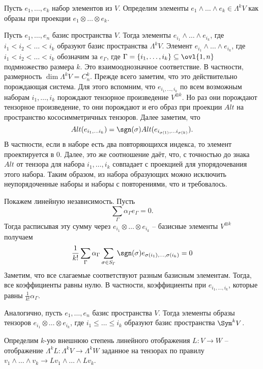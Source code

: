 \dfn Пусть $e_1,\dots, e_k$ набор элементов из $V$. Определим элементы $e_1\wedge \dots \wedge e_k \in \Lambda^k V$ как образы при проекции $e_1\otimes \dots \otimes e_k$.
\edfn

\thrm Пусть $e_1,\dots, e_n$ базис пространства $V$. Тогда элементы $e_{i_1}\wedge \dots \wedge e_{i_k}$, где $i_1<i_2< \dots < i_k$ образуют базис пространства $\Lambda^k V$. Элемент $e_{i_1}\wedge \dots \wedge e_{i_k}$, где $i_1<i_2< \dots < i_k$  обозначим за $e_{\Gamma}$, где $\Gamma =\{i_1,\dots,i_k\}\subseteq \ovl{1,n}$ подмножество размера $k$. Это взаимооднозначное соответствие. В частности, размерность $\dim \Lambda^k V = C^k_n$. 
\proof Прежде всего заметим, что это действительно порождающая система. Для этого вспомним, что $e_{i_1,\dots,i_k}$ по всем возможным наборам $i_1,\dots,i_k$ порождают тензорное произведение $V^{\otimes k}$. Но раз они порождают тензорное произведение, то они порождают и его образ при проекции $Alt$ на пространство кососимметричных тензоров. Далее заметим, что $$Alt(e_{i_1,\dots i_k})= \sgn(\sigma) Alt(e_{i_{\sigma(1)},\dots i_{\sigma(k)}}).$$
В частности, если в наборе есть два повторяющихся индекса, то элемент проектируется в 0. Далее, это же соотношение даёт, что,  с точностью до знака $Alt$ от тензора для набора $i_1,\dots,i_k$ совпадает с проекцией для упорядочевания этого набора. Таким образом, из набора образующих можно исключить неупорядоченные наборы и наборы с повторениями, что и требовалось.

\noindent Покажем линейную независимость. Пусть  
$$\sum_{\Gamma} \alpha_{\Gamma} e_{\Gamma}=0.$$
Тогда расписывая эту сумму через $e_{i_1}\otimes \dots \otimes e_{i_k}$ -- базисные элементы $V^{\otimes k}$ получаем
$$\frac{1}{k!}\sum_{\Gamma} \alpha_{\Gamma} \sum_{\sigma \in S_{\Gamma}} \sgn(\sigma) e_{\sigma(i_1),\dots,\sigma(i_k)} =0 $$
Заметим, что все слагаемые соответствуют разным базисным элементам. Тогда, все коэффициенты равны нулю. В частности, коэффициенты при $ e_{i_1, \dots, i_k}$, которые равны $\frac{1}{k!}\alpha_{\Gamma}$. 

\endproof
\ethrm

\thrm Аналогично, пусть $e_1,\dots, e_n$ базис пространства $V$. Тогда элементы образы тензоров $e_{i_1}\otimes \dots \otimes e_{i_k}$, где $i_1\leq \dots \leq i_k$ образуют базис пространства $\Sym^k V$.
\ethrm

\dfn Определим $k$-ую внешнюю степень линейного отображения $L\colon V \to W$ -- отображение $\Lambda^{k} L  \colon \Lambda^k V \to \Lambda^k W$ заданное на тензорах по правилу $v_1\wedge \dots \wedge v_k \to L v_1 \wedge \dots \wedge L v_k$. 
\edfn

